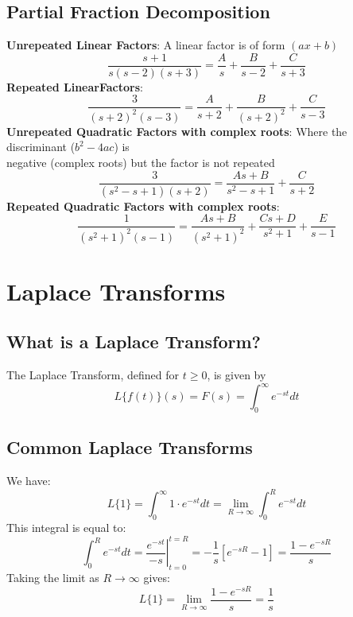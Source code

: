 \documentclass[a4paper, 10pt]{article}
\begin{document}
\subsection{Partial Fraction Decomposition}
\textbf{Unrepeated Linear Factors}: A linear factor is of form $(ax + b)$
$$\frac{s + 1}{s(s-2)(s+3)} = \frac{A}{s} + \frac{B}{s-2} + \frac{C}{s+3}$$
\textbf{Repeated LinearFactors}:
$$\frac{3}{(s+2)^2(s-3)} = \frac{A}{s+2} + \frac{B}{(s+2)^2} + \frac{C}{s-3}$$
\textbf{Unrepeated Quadratic Factors with complex roots}: Where the discriminant ($b^2 - 4ac$) is \\
\indent negative (complex roots) but the factor is not repeated
$$\frac{3}{(s^2 - s + 1)(s+2)} = \frac{As + B}{s^2 - s + 1} + \frac{C}{s+2}$$
\textbf{Repeated Quadratic Factors with complex roots}:
$$\frac{1}{(s^2 + 1)^2 (s-1)} = \frac{As + B}{(s^2 + 1)^2} + \frac{Cs + D}{s^2 + 1} + \frac{E}{s-1}$$


\pagebreak
\section{Laplace Transforms}
\subsection{What is a Laplace Transform?}
The Laplace Transform, defined for $t \geq 0$, is given by
$$L\{f(t)\}(s) = F(s) = \int_0^\infty e^{-st} dt$$

\subsection{Common Laplace Transforms}

\begin{examplebox}[Find the Laplace Transform of \boldmath$f(t) = 1$]
  We have:
  $$L\{1\} = \int_0^\infty 1 \cdot e^{-st } dt = \lim_{R \to \infty} \int_0^R e^{-st} dt$$
  This integral is equal to:
  $$\int_0^R e^{-st} dt = \left . \frac{e^{-st}}{-s}\right |_{t=0}^{t=R}
    = -\frac{1}{s}[e^{-sR} - 1] = \frac{1 - e^{-sR}}{s}$$
  Taking the limit as $R \to \infty$ gives:
  $$L\{1\} = \lim_{R \to \infty} \frac{1 - e^{-sR}}{s} = \frac{1}{s}$$
\end{examplebox}
\end{document}
